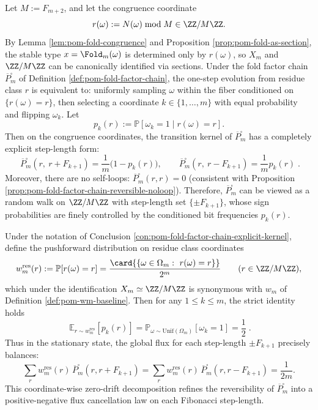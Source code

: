 \begin{conclusion}\label{con:pom-fold-factor-chain-explicit-kernel}
Let \(M:=F_{m+2}\), and let the congruence coordinate
\[
r(\omega):=N(\omega)\bmod M\in\ZZ/M\ZZ.
\]
By Lemma \ref{lem:pom-fold-congruence} and Proposition \ref{prop:pom-fold-as-section}, the stable type \(x=\Fold_m(\omega)\) is determined only by \(r(\omega)\), so \(X_m\) and \(\ZZ/M\ZZ\) can be canonically identified via sections.
Under the fold factor chain \(\overline P_m^{\square}\) of Definition \ref{def:pom-fold-factor-chain}, the one-step evolution from residue class \(r\) is equivalent to:
uniformly sampling \(\omega\) within the fiber conditioned on \(\{r(\omega)=r\}\), then selecting a coordinate \(k\in\{1,\dots,m\}\) with equal probability and flipping \(\omega_k\).
Let
\[
p_k(r):=\mathbb P[\omega_k=1\mid r(\omega)=r].
\]
Then on the congruence coordinates, the transition kernel of \(\overline P_m^{\square}\) has a completely explicit step-length form:
\[
\boxed{\;
\overline P_m^{\square}(r,\ r+F_{k+1})=\frac{1}{m}\bigl(1-p_k(r)\bigr),\qquad
\overline P_m^{\square}(r,\ r-F_{k+1})=\frac{1}{m}p_k(r)\; }.
\]
Moreover, there are no self-loops: \(\overline P_m^{\square}(r,r)=0\) (consistent with Proposition \ref{prop:pom-fold-factor-chain-reversible-noloop}).
Therefore, \(\overline P_m^{\square}\) can be viewed as a random walk on \(\ZZ/M\ZZ\) with step-length set \(\{\pm F_{k+1}\}\), whose sign probabilities are finely controlled by the conditioned bit frequencies \(p_k(r)\).
\end{conclusion}

\begin{conclusion}\label{con:pom-fold-factor-chain-no-drift}
Under the notation of Conclusion \ref{con:pom-fold-factor-chain-explicit-kernel}, define the pushforward distribution on residue class coordinates
\[
w_m^{\mathrm{res}}(r):=\mathbb P[r(\omega)=r]=\frac{\card{\{\omega\in\Omega_m:\ r(\omega)=r\}}}{2^m}\qquad(r\in\ZZ/M\ZZ),
\]
which under the identification \(X_m\simeq\ZZ/M\ZZ\) is synonymous with \(w_m\) of Definition \ref{def:pom-wm-baseline}.
Then for any \(1\le k\le m\), the strict identity holds
\[
\boxed{\;
\mathbb E_{r\sim w_m^{\mathrm{res}}}[p_k(r)]
=\mathbb P_{\omega\sim\mathrm{Unif}(\Omega_m)}[\omega_k=1]
=\frac12\; }.
\]
Thus in the stationary state, the global flux for each step-length \(\pm F_{k+1}\) precisely balances:
\[
\sum_{r}w_m^{\mathrm{res}}(r)\,\overline P_m^{\square}(r,r+F_{k+1})
=\sum_{r}w_m^{\mathrm{res}}(r)\,\overline P_m^{\square}(r,r-F_{k+1})
=\frac{1}{2m}.
\]
This coordinate-wise zero-drift decomposition refines the reversibility of \(\overline P_m^{\square}\) into a positive-negative flux cancellation law on each Fibonacci step-length.
\end{conclusion}

